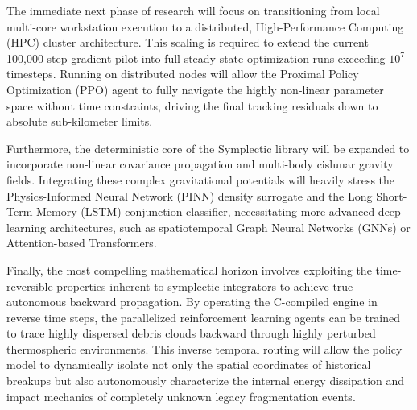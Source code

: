 \documentclass[letterpaper, preprint, 11pt]{AAS}
\begin{document}
The immediate next phase of research will focus on transitioning from local multi-core workstation execution to a distributed, High-Performance Computing (HPC) cluster architecture. This scaling is required to extend the current 100,000-step gradient pilot into full steady-state optimization runs exceeding $10^7$ timesteps. Running on distributed nodes will allow the Proximal Policy Optimization (PPO) agent to fully navigate the highly non-linear parameter space without time constraints, driving the final tracking residuals down to absolute sub-kilometer limits.

Furthermore, the deterministic core of the Symplectic library will be expanded to incorporate non-linear covariance propagation and multi-body cislunar gravity fields. Integrating these complex gravitational potentials will heavily stress the Physics-Informed Neural Network (PINN) density surrogate and the Long Short-Term Memory (LSTM) conjunction classifier, necessitating more advanced deep learning architectures, such as spatiotemporal Graph Neural Networks (GNNs) or Attention-based Transformers.

Finally, the most compelling mathematical horizon involves exploiting the time-reversible properties inherent to symplectic integrators to achieve true autonomous backward propagation. By operating the C-compiled engine in reverse time steps, the parallelized reinforcement learning agents can be trained to trace highly dispersed debris clouds backward through highly perturbed thermospheric environments. This inverse temporal routing will allow the policy model to dynamically isolate not only the spatial coordinates of historical breakups but also autonomously characterize the internal energy dissipation and impact mechanics of completely unknown legacy fragmentation events.



\end{document}
